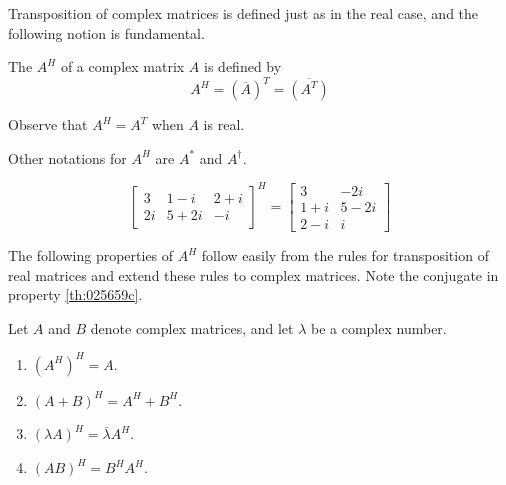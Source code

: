\documentclass{ximera}
\begin{document}
Transposition of complex matrices is defined just as in the real case, and the following notion is fundamental.


\begin{definition}\label{dfn:conjtrans}
The  $A^{H}$ of a complex matrix $A$ is defined by
\begin{equation*}
A^H = (\overline{A})^T = \overline{(A^T)}
\end{equation*}
\end{definition}

Observe that $A^{H} = A^{T}$ when $A$ is real.

\begin{remark}
    Other notations for $A^{H}$ are $A^\ast$ and $A^\dagger$.
\end{remark}

\begin{example}\label{ex:025654}
\begin{equation*}
\left[ \begin{array}{ccr}
3 & 1 - i & 2 + i \\
2i & 5 + 2i & -i
\end{array}\right]^H = \left[ \begin{array}{cc}
3 & -2i \\
1 + i & 5 - 2i \\
2 - i & i
\end{array}\right]
\end{equation*}
\end{example}

The following properties of $A^{H}$ follow easily from the rules for transposition of real matrices and extend these rules to complex matrices. Note the conjugate in property \ref{th:025659c}.


\begin{theorem}\label{th:025659}
Let $A$ and $B$ denote complex matrices, and let $\lambda$ be a complex number.

\begin{enumerate}
\item\label{th:025659a} $(A^{H})^{H} = A$.

\item\label{th:025659b} $(A + B)^{H} = A^{H} + B^{H}$.

\item\label{th:025659c} $(\lambda A)^H = \overline{\lambda}A^H$.

\item\label{th:025659d} $(AB)^{H} = B^{H}A^{H}$.

\end{enumerate}
\end{theorem}
\end{document}
